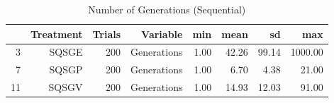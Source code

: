 \begin{table}[ht]
\centering
\begin{tabular}{rrrrrrrr}
  \hline
 & Treatment & Trials & Variable & min & mean & sd & max \\ 
  \hline
3 & SQSGE & 200 & Generations & 1.00 & 42.26 & 99.14 & 1000.00 \\ 
  7 & SQSGP & 200 & Generations & 1.00 & 6.70 & 4.38 & 21.00 \\ 
  11 & SQSGV & 200 & Generations & 1.00 & 14.93 & 12.03 & 91.00 \\ 
   \hline
\end{tabular}
\caption{Number of Generations (Sequential)} 
\end{table}
